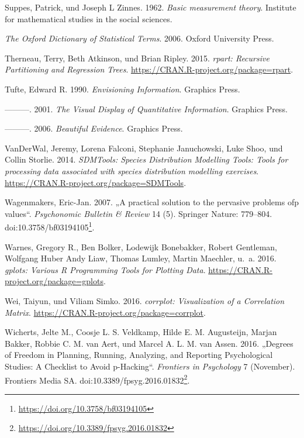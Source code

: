 \documentclass[12pt,ngerman,]{book}
\let\rmarkdownfootnote\footnote%
\def\footnote{\protect\rmarkdownfootnote}
\renewcommand{\href}[2]{#2\footnote{\url{#1}}}
\begin{document}
\hypertarget{ref-suppes1962basic}{}
Suppes, Patrick, und Joseph L Zinnes. 1962. \emph{Basic measurement
theory}. Institute for mathematical studies in the social sciences.

\hypertarget{ref-oxford}{}
\emph{The Oxford Dictionary of Statistical Terms}. 2006. Oxford
University Press.

\hypertarget{ref-R-rpart}{}
Therneau, Terry, Beth Atkinson, und Brian Ripley. 2015. \emph{rpart:
Recursive Partitioning and Regression Trees}.
\url{https://CRAN.R-project.org/package=rpart}.

\hypertarget{ref-1930824149}{}
Tufte, Edward R. 1990. \emph{Envisioning Information}. Graphics Press.

\hypertarget{ref-1930824130}{}
---------. 2001. \emph{The Visual Display of Quantitative Information}.
Graphics Press.

\hypertarget{ref-1930824165}{}
---------. 2006. \emph{Beautiful Evidence}. Graphics Press.

\hypertarget{ref-R-SDMTools}{}
VanDerWal, Jeremy, Lorena Falconi, Stephanie Januchowski, Luke Shoo, und
Collin Storlie. 2014. \emph{SDMTools: Species Distribution Modelling
Tools: Tools for processing data associated with species distribution
modelling exercises}. \url{https://CRAN.R-project.org/package=SDMTools}.

\hypertarget{ref-Wagenmakers2007}{}
Wagenmakers, Eric-Jan. 2007. „A practical solution to the pervasive
problems ofp values``. \emph{Psychonomic Bulletin \& Review} 14 (5).
Springer Nature: 779--804.
doi:\href{https://doi.org/10.3758/bf03194105}{10.3758/bf03194105}.

\hypertarget{ref-R-gplots}{}
Warnes, Gregory R., Ben Bolker, Lodewijk Bonebakker, Robert Gentleman,
Wolfgang Huber Andy Liaw, Thomas Lumley, Martin Maechler, u.~a. 2016.
\emph{gplots: Various R Programming Tools for Plotting Data}.
\url{https://CRAN.R-project.org/package=gplots}.

\hypertarget{ref-R-corrplot}{}
Wei, Taiyun, und Viliam Simko. 2016. \emph{corrplot: Visualization of a
Correlation Matrix}. \url{https://CRAN.R-project.org/package=corrplot}.

\hypertarget{ref-Wicherts2016}{}
Wicherts, Jelte M., Coosje L. S. Veldkamp, Hilde E. M. Augusteijn,
Marjan Bakker, Robbie C. M. van Aert, und Marcel A. L. M. van Assen.
2016. „Degrees of Freedom in Planning, Running, Analyzing, and Reporting
Psychological Studies: A Checklist to Avoid p-Hacking``. \emph{Frontiers
in Psychology} 7 (November). Frontiers Media SA.
doi:\href{https://doi.org/10.3389/fpsyg.2016.01832}{10.3389/fpsyg.2016.01832}.
\end{document}
